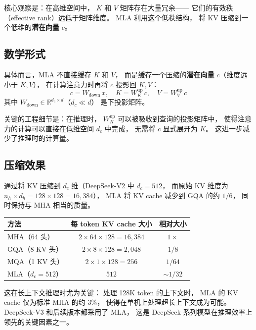 核心观察是：在高维空间中，
$K$ 和 $V$ 矩阵存在大量冗余——
它们的有效秩（effective rank）远低于矩阵维度。
MLA 利用这个低秩结构，
将 KV 压缩到一个低维的\textbf{潜在向量} $c$。

\subsection{数学形式}

具体而言，MLA 不直接缓存 $K$ 和 $V$，
而是缓存一个压缩的\textbf{潜在向量} $c$（维度远小于 $K, V$），
在计算注意力时再将 $c$ 投影回 $K, V$：
\begin{equation}
  c = W_{\mathrm{down}} \, x, \quad
  K = W_K^{\mathrm{up}} \, c, \quad
  V = W_V^{\mathrm{up}} \, c
\end{equation}
其中 $W_{\mathrm{down}} \in \mathbb{R}^{d_c \times d}$（$d_c \ll d$）
是下投影矩阵。

关键的工程细节是：在推理时，
$W_K^{\mathrm{up}}$ 可以被吸收到查询的投影矩阵中，
使得注意力的计算可以直接在低维空间 $d_c$ 中完成，
无需将 $c$ 显式展开为 $K$。
这进一步减少了推理时的计算量。

\subsection{压缩效果}

通过将 KV 压缩到 $d_c$ 维（DeepSeek-V2 中 $d_c = 512$，
而原始 KV 维度为 $n_h \times d_h = 128 \times 128 = 16{,}384$），
MLA 将 KV cache 减少到 GQA 的约 $1/6$，
同时保持与 MHA 相当的质量。

\begin{center}
\begin{tabular}{lcc}
\hline
\textbf{方法} & \textbf{每 token KV cache 大小} & \textbf{相对大小} \\
\hline
MHA（64 头） & $2 \times 64 \times 128 = 16{,}384$ & $1\times$ \\
GQA（8 KV 头） & $2 \times 8 \times 128 = 2{,}048$ & $1/8$ \\
MQA（1 KV 头） & $2 \times 1 \times 128 = 256$ & $1/64$ \\
MLA（$d_c = 512$） & $512$ & $\sim 1/32$ \\
\hline
\end{tabular}
\end{center}

这在长上下文推理时尤为关键：
处理 128K token 的上下文时，
MLA 的 KV cache 仅为标准 MHA 的约 3\%，
使得在单机上处理超长上下文成为可能。
DeepSeek-V3 和后续版本都采用了 MLA，
这是 DeepSeek 系列模型在推理效率上领先的关键因素之一。

